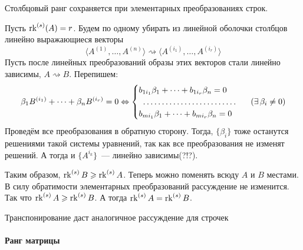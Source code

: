 \documentclass[12pt]{../../../notes}
\begin{document}
\begin{lem}\label{lem:colranktransf}
  Столбцовый ранг сохраняется при элементарных преобразованиях строк.
\end{lem}
\begin{itlproof}
  Пусть $\operatorname{rk}^{(s)} (A) = r$.
  Будем по одному убирать из линейной оболочки столбцов линейно выражающиеся векторы
  \[
    \langle A^{(1)}, \dotsc , A^{(n)}\rangle \rightsquigarrow 
    \langle A^{(i_1)}, \dotsc , A^{(i_r)}\rangle
  \]
  Пусть после линейных преобразований образы этих векторов стали линейно зависимы, 
  $A \rightsquigarrow B$. Перепишем:
  \begin{align*}
    \beta_1 B^{(i_1)}+ \dotsb + \beta_n B^{(i_r)} = 0 
    \Leftrightarrow
    \begin{cases}
      b_{1i_1} \beta_1 + \dotsb + b_{1i_r} \beta_n = 0\\
      \hdotsfor{1} \\
      b_{mi_1} \beta_1 + \dotsb + b_{mi_r} \beta_n = 0
    \end{cases} \quad (\exists\, \beta_i \neq 0)
  \end{align*}
  Проведём все преобразования в обратную сторону. Тогда, $\{\beta_i\}$ тоже останутся решениями
  такой системы уравнений, так как все преобразования не изменят решений.
  А тогда и $\{A^{i_k}\}$~--- линейно зависимы(?!?).

  Таким образом, $\operatorname{rk}^{(s)} B \geqslant \operatorname{rk}^{(s)} A$. Теперь можно поменять всюду $A$ и $B$ местами.
  В силу обратимости элементарных преобразований рассуждение не изменится. 
  Так что $\operatorname{rk}^{(s)} A \geqslant \operatorname{rk}^{(s)} B$. А тогда $\operatorname{rk}^{(s)} A = \operatorname{rk}^{(s)} B$.
\end{itlproof}
Транспонирование даст аналогичное рассуждение для строчек

\paragraph{Ранг матрицы}
\end{document}
